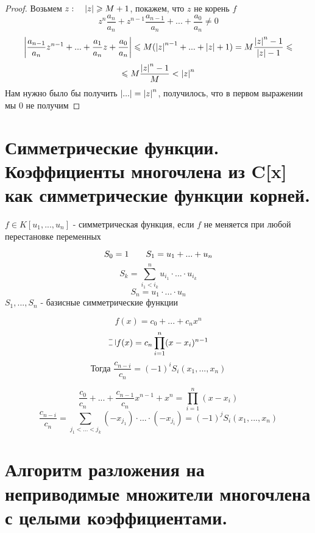 \documentclass[algebra]{subfiles}
\begin{document}
    \begin{proof}
        Возьмем $z :  \quad \left|z\right| \geqslant M + 1$, покажем, что $z$  не корень $f$
        \[z^n \frac{a_n}{a_n} + z^{n - 1}  \frac{a_{n - 1} }{a_n} + ... + \frac{a_0}{a_n} \neq 0\]
        \[\left|\frac{a_{n - 1} }{a_n} z^{n - 1} + ... + \frac{a_1}{a_n} z  + \frac{a_0}{a_n}\right| \leqslant M(\left|z\right|^{n - 1} + ... + \left|z\right| + 1)
        = M \frac{\left|z\right|^n - 1}{\left|z\right| - 1} \leqslant\]
        \[\leqslant M \frac{\left|z\right|^n - 1}{M} < \left|z\right|^n\]
        Нам нужно было бы получить $\left|...\right| = \left|z\right|^n$, получилось, что в первом выражении мы 0 не получим
    \end{proof}

    \section{Симметрические функции. Коэффициенты многочлена из C[x] как симметрические функции корней.}

    \begin{definition}
        $f \in K[u_1, ..., u_n]$ - симметрическая функция, если $f$ не меняется при любой перестановке переменных
        \begin{Example}
            \[S_0 = 1 \qquad S_1 = u_1 + ... + u_n\]
            \[S_k = \sum_{i_1 < i_k}^n u_{i_1} \cdot ... \cdot u_{i_k}\]
            \[S_n = u_1 \cdot ... \cdot u_n\]
            $S_1,...,S_n$ - базисные симметрические функции
        \end{Example}
    \end{definition}

    \begin{Theorem}[Виета]
        \[f(x) = c_0 + ... + c_n x^n\]
        \[\letus f(x) = c_n \prod_{i=1}^n (x - x_i)^{n-1}\]
        \[\text{Тогда } \frac{c_{n-i}}{c_n} = (-1)^i S_i (x_1,...,x_n)\]
    \end{Theorem}

    \begin{Proof}
        \[\frac{c_0}{c_n} + ... + \frac{c_{n-1}}{c_n}x^{n-1} + x^n = \prod_{i=1}^n (x - x_i)\]
        \[\frac{c_{n-i}}{c_n} = \sum_{j_1 < ... < j_k} (-x_{j_1}) \cdot ... \cdot (-x_{j_i}) = (-1)^j S_i(x_1,...,x_n)\]
    \end{Proof}

    \section{Алгоритм разложения на неприводимые множители многочлена с целыми коэффициентами.}
\end{document}
